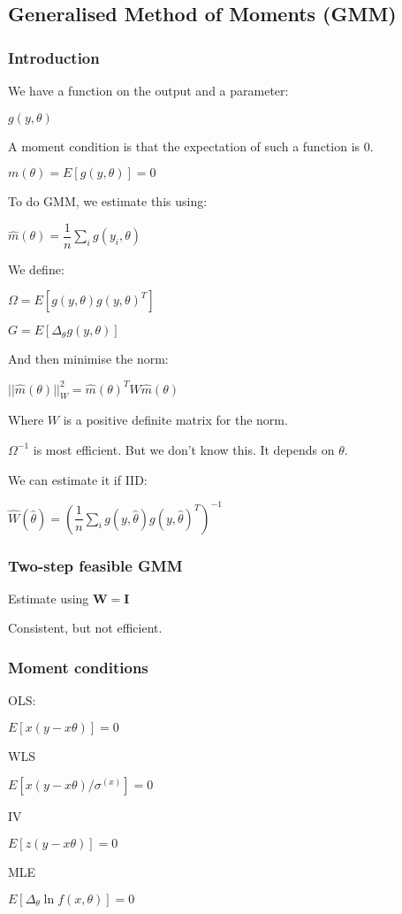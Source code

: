
\subsection{Generalised Method of Moments (GMM)}

\subsubsection{Introduction}

We have a function on the output and a parameter:

\(g(y, \theta )\)

A moment condition is that the expectation of such a function is \(0\).

\(m(\theta )=E[g(y, \theta )]=0\)

To do GMM, we estimate this using:

\(\hat m(\theta )=\dfrac{1}{n}\sum_ig(y_i, \theta )\)

We define:

\(\Omega = E[g(y, \theta )g(y, \theta)^T]\)

\(G=E[\Delta_\theta g(y, \theta)]\)

And then minimise the norm:

\(||\hat m(\theta )||^2_W=\hat m(\theta )^TW\hat m(\theta )\)

Where \(W\) is a positive definite matrix for the norm.

\(\Omega ^{-1}\) is most efficient. But we don't know this. It depends on \(\theta \).

We can estimate it if IID:

\(\hat W(\hat \theta )= (\dfrac{1}{n}\sum_i g(y, \hat \theta)g(y, \hat \theta)^T)^{-1}\)

\subsubsection{Two-step feasible GMM}

Estimate using \(\mathbf W=\mathbf I\)

Consistent, but not efficient.

\subsubsection{Moment conditions}

OLS:

\(E[x(y-x\theta)]=0\)

WLS

\(E[x(y-x\theta)/\sigma^(x)]=0\)

IV

\(E[z(y-x\theta)]=0\)

MLE

\(E[\Delta_\theta \ln f(x, \theta)]=0\)

